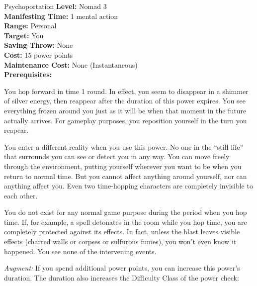 {Psychoportation}
{
	\textbf{Level:}
	Nomad 3\\
	\textbf{Manifesting Time:}
	1 mental action\\
	\textbf{Range:}
	Personal\\
	\textbf{Target:}
	You\\
	\textbf{Saving Throw:}
	None\\
	\textbf{Cost:}
	15 power points\\
	\textbf{Maintenance Cost:}
	None (Instantaneous)\\
	\textbf{Prerequisites:}
	\\
}
{
	You hop forward in time 1 round. In effect, you seem to disappear in a shimmer of silver energy, then reappear after the duration of this power expires. You see everything frozen around you just as it will be when that moment in the future actually arrives. For gameplay purposes, you reposition yourself in the turn you reapear.

	You enter a different reality when you use this power. No one in the ``still life'' that surrounds you can see or detect you in any way. You can move freely through the environment, putting yourself wherever you want to be when you return to normal time. But you cannot affect anything around yourself, nor can anything affect you. Even two time-hopping characters are completely invisible to each other. 

	You do not exist for any normal game purpose during the period when you hop time. If, for example, a  spell detonates in the room while you hop time, you are completely protected against its effects. In fact, unless the blast leaves visible effects (charred walls or corpses or sulfurous fumes), you won't even know it happened. You see none of the intervening events.

	\textit{Augment:} If you spend additional power points, you can increase this power's duration. The duration also increases the Difficulty Class of the power check:

}